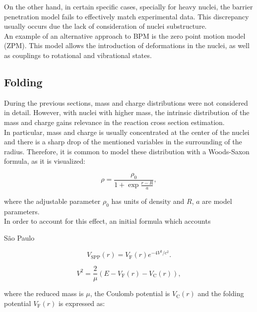 \documentclass[openany]{book}
\begin{document}
On the other hand, in certain specific cases, specially for heavy nuclei, the barrier penetration model fails to effectively match experimental data. This discrepancy usually occurs due the lack of consideration of nuclei substructure. \\

An example of an alternative approach to BPM is the zero point motion model (ZPM). This model allows the introduction of deformations in the nuclei, as well as couplings to rotational and vibrational states. 


\subsection{Folding} \label{sub:potential_folding}

During the previous sections, mass and charge distributions were not considered in detail. However, with nuclei with higher mass, the intrinsic distribution of the mass and charge gains relevance in the reaction cross section estimation. \\

In particular, mass and charge is usually concentrated at the center of the nuclei and there is a sharp drop of the mentioned variables in the surrounding of the radius. Therefore, it is common to model these distribution with a Woods-Saxon formula, as it is visualized: 

\begin{equation}
	\rho = \frac{\rho_0}{1 + \exp{\frac{r - R}{a}}},
\end{equation}

where the adjustable parameter $\rho_0$ has units of density and $R$, $a$ are model parameters. \\

In order to account for this effect, an initial formula which accounts 

São Paulo \cite{chamon_2007}

\begin{equation} \label{eq:potential_SaoPaulo}
	V_{\mathrm{SPP}} (r) = V_{\mathrm{F}} (r)e^{-4V^2/c^2}.
\end{equation}

\begin{equation} \label{eq:potential_SaoPaulo_speed}
	V^2 = \frac{2}{\mu} \left( E - V_{\mathrm{F}}(r) - V_{\mathrm{C}}(r) \right),
\end{equation}

where the reduced mass is $\mu$, the Coulomb potential is $V_{\mathrm{C}}(r)$ and the folding potential  $V_{\mathrm{F}}(r)$ is expressed as:
\end{document}
